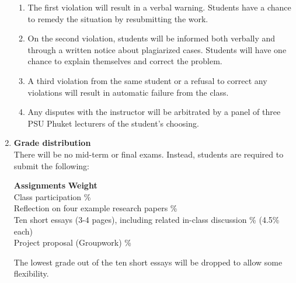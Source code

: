 \documentclass[a4paper,12pt]{article}
\begin{document}
\begin{enumerate}[label=\textbf{\Alph*}]
        \begin{enumerate}
            \item The first violation will result in a verbal warning. Students have a chance to remedy the situation by resubmitting the work.
            \item On the second violation, students will be informed both verbally and through a written notice about plagiarized cases. Students will have one chance to explain themselves and correct the problem.
            \item A third violation from the same student or a refusal to correct any violations will result in automatic failure from the class.
            \item Any disputes with the instructor will be arbitrated by a panel of three PSU Phuket lecturers of the student's choosing.
        \end{enumerate}
    \item \textbf{Grade distribution} \hfill \\
    There will be no mid-term or final exams. Instead, students are required to submit the following:
        \begin{tabbing}
            \textbf{Assignments} \hspace{10cm} \=\textbf{Weight} \\
            Class participation \% \\
            Reflection on four example research papers \% \\
            Ten short essays (3-4 pages), including related in-class discussion  \% (4.5\% each) \\
            Project proposal (Groupwork) \% \\
        \end{tabbing}

   The lowest grade out of the ten short essays will be dropped to allow some flexibility.


\end{enumerate}
\end{document}
